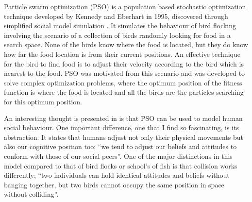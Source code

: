 \documentclass{pdfmx4020}
\begin{document}

  Particle swarm optimization (PSO) is a population based  stochastic optimization technique developed by Kennedy and  Eberhart in 1995, discovered through simplified social model simulation \cite{pso,pso2,pso3,pso4}. It simulates the behaviour of bird flocking involving the scenario of a collection of birds randomly looking for food in a search space. None of the birds know where the food is located, but they do know how far the food location is from their current positions. An effective technique for the bird to find food is to adjust their velocity according to the bird which is nearest to the food. PSO was motivated from this scenario and was developed to solve complex optimization problems, where the optimum position of the fitness function is where the food is located and all the birds are the particles searching for this optimum position. 

  An interesting thought is presented in \cite{pso} is that PSO can be used to model human social behaviour. One important difference, one that I find so fascinating, is its abstraction. It states that humans adjust not only their physical movements but also our cognitive position too; ``we tend to adjust our beliefs and attitudes to conform with those of our social peers''\cite{pso}. One of the major distinctions in this model compared to that of bird flocks or school's of fish is that collision works differently; ``two individuals can hold identical attitudes and beliefs without banging together, but two birds cannot occupy the same position in space without colliding''.
\end{document}
